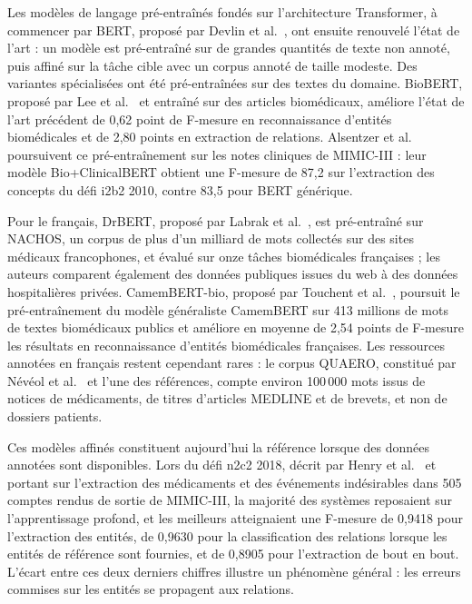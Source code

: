 Les modèles de langage pré-entraînés fondés sur l'architecture Transformer, à commencer par BERT, proposé par Devlin et al.~\cite{devlin2019bert}, ont ensuite renouvelé l'état de l'art : un modèle est pré-entraîné sur de grandes quantités de texte non annoté, puis affiné sur la tâche cible avec un corpus annoté de taille modeste. Des variantes spécialisées ont été pré-entraînées sur des textes du domaine. BioBERT, proposé par Lee et al.~\cite{lee2020biobert} et entraîné sur des articles biomédicaux, améliore l'état de l'art précédent de 0,62 point de F-mesure en reconnaissance d'entités biomédicales et de 2,80 points en extraction de relations. Alsentzer et al.~\cite{alsentzer2019clinicalbert} poursuivent ce pré-entraînement sur les notes cliniques de MIMIC-III : leur modèle Bio+ClinicalBERT obtient une F-mesure de 87,2 sur l'extraction des concepts du défi i2b2 2010, contre 83,5 pour BERT générique.

Pour le français, DrBERT, proposé par Labrak et al.~\cite{labrak2023drbert}, est pré-entraîné sur NACHOS, un corpus de plus d'un milliard de mots collectés sur des sites médicaux francophones, et évalué sur onze tâches biomédicales françaises ; les auteurs comparent également des données publiques issues du web à des données hospitalières privées. CamemBERT-bio, proposé par Touchent et al.~\cite{touchent2024camembertbio}, poursuit le pré-entraînement du modèle généraliste CamemBERT sur 413 millions de mots de textes biomédicaux publics et améliore en moyenne de 2,54 points de F-mesure les résultats en reconnaissance d'entités biomédicales françaises. Les ressources annotées en français restent cependant rares : le corpus QUAERO, constitué par Névéol et al.~\cite{neveol2014quaero} et l'une des références, compte environ 100\,000 mots issus de notices de médicaments, de titres d'articles MEDLINE et de brevets, et non de dossiers patients.

Ces modèles affinés constituent aujourd'hui la référence lorsque des données annotées sont disponibles. Lors du défi n2c2 2018, décrit par Henry et al.~\cite{henry2020n2c2} et portant sur l'extraction des médicaments et des événements indésirables dans 505 comptes rendus de sortie de MIMIC-III, la majorité des systèmes reposaient sur l'apprentissage profond, et les meilleurs atteignaient une F-mesure de 0,9418 pour l'extraction des entités, de 0,9630 pour la classification des relations lorsque les entités de référence sont fournies, et de 0,8905 pour l'extraction de bout en bout. L'écart entre ces deux derniers chiffres illustre un phénomène général : les erreurs commises sur les entités se propagent aux relations.

